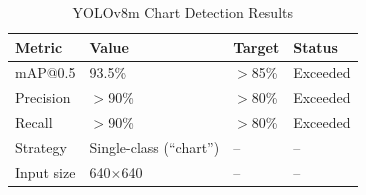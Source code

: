 \begin{table}[htbp]
\centering
\caption{YOLOv8m Chart Detection Results}
\label{tab:yolo-results}
\begin{tabular}{@{}llll@{}}
\toprule
\textbf{Metric} & \textbf{Value} & \textbf{Target} & \textbf{Status} \\
\midrule
mAP@0.5   & 93.5\% & $>$85\% & Exceeded \\
Precision  & $>$90\% & $>$80\% & Exceeded \\
Recall     & $>$90\% & $>$80\% & Exceeded \\
Strategy   & Single-class (``chart'') & -- & -- \\
Input size & 640$\times$640 & -- & -- \\
\bottomrule
\end{tabular}
\end{table}